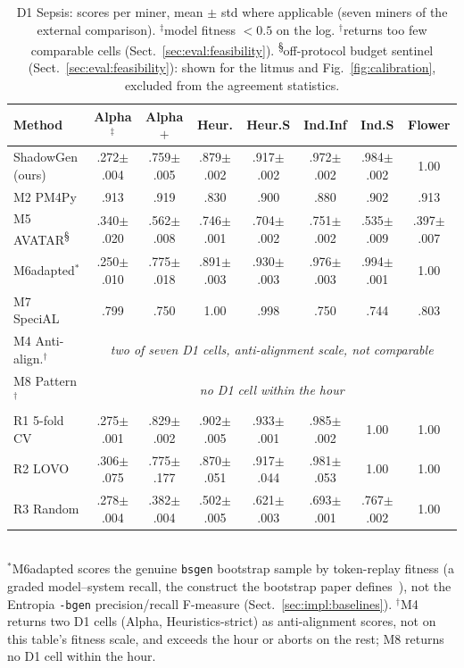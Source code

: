 \documentclass[runningheads]{llncs}
\newcommand{\chg}[1]{\textcolor{chgblue}{#1}}
\begin{document}
\begin{table}[h]
\centering
\caption{D1 Sepsis: scores per miner, mean $\pm$ std where applicable (seven miners of the external comparison). $^{\ddagger}$model fitness $<0.5$ on the log. $^{\dagger}$returns too few comparable cells (Sect.~\ref{sec:eval:feasibility}). \chg{\textsuperscript{\S}off-protocol budget sentinel (Sect.~\ref{sec:eval:feasibility}): shown for the litmus and Fig.~\ref{fig:calibration}, excluded from the agreement statistics.}}
\label{tab:external}
\setlength{\tabcolsep}{1.6pt}
\scriptsize
\begin{tabular}{@{}lccccccc@{}}
\toprule
Method & Alpha$^{\ddagger}$ & Alpha$+$ & Heur. & Heur.S & Ind.Inf & Ind.S & Flower \\
\midrule
\chg{ShadowGen (ours)} & .272$\pm$.004 & .759$\pm$.005 & .879$\pm$.002 & .917$\pm$.002 & .972$\pm$.002 & .984$\pm$.002 & 1.00 \\
M2 PM4Py & .913 & .919 & .830 & .900 & .880 & .902 & .913 \\
M5 AVATAR\chg{\textsuperscript{\S}} & .340$\pm$.020 & .562$\pm$.008 & .746$\pm$.001 & .704$\pm$.002 & .751$\pm$.002 & .535$\pm$.009 & .397$\pm$.007 \\
M6adapted$^{*}$ & .250$\pm$.010 & .775$\pm$.018 & .891$\pm$.003 & .930$\pm$.003 & .976$\pm$.003 & .994$\pm$.001 & 1.00 \\
M7 SpeciAL & .799 & .750 & 1.00 & .998 & .750 & .744 & .803 \\
M4 Anti-align.$^{\dagger}$ & \multicolumn{7}{c}{\emph{two of seven D1 cells, anti-alignment scale, not comparable}} \\
M8 Pattern$^{\dagger}$ & \multicolumn{7}{c}{\emph{no D1 cell within the hour}} \\
\midrule
R1 5-fold CV & .275$\pm$.001 & .829$\pm$.002 & .902$\pm$.005 & .933$\pm$.001 & .985$\pm$.002 & 1.00 & 1.00 \\
R2 LOVO & .306$\pm$.075 & .775$\pm$.177 & .870$\pm$.051 & .917$\pm$.044 & .981$\pm$.053 & 1.00 & 1.00 \\
R3 Random & .278$\pm$.004 & .382$\pm$.004 & .502$\pm$.005 & .621$\pm$.003 & .693$\pm$.001 & .767$\pm$.002 & 1.00 \\
\bottomrule
\end{tabular}\\[2pt]
{\scriptsize $^{*}$M6adapted scores the genuine \texttt{bsgen} bootstrap sample by token-replay fitness (a graded model--system recall, the construct the bootstrap paper defines~\cite{polyvyanyy2022bootstrap}), not the Entropia \texttt{-bgen} precision/recall F-measure (Sect.~\ref{sec:impl:baselines}). $^{\dagger}$M4 returns two D1 cells (Alpha, Heuristics-strict) as anti-alignment scores, not on this table's fitness scale, and exceeds the hour or aborts on the rest; M8 returns no D1 cell within the hour.}
\end{table}



\end{document}
